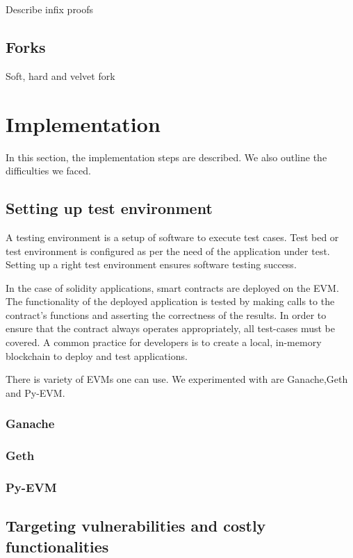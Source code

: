 \documentclass{article}
\begin{document}
  Describe infix proofs

  \subsection{Forks}

  Soft, hard and velvet fork

  \section{Implementation}

  In this section, the implementation steps are described. We also
  outline the difficulties we faced.

  \subsection{Setting up test environment}

  A testing environment is a setup of software to execute test cases.
  Test bed or test environment is configured as per the need of the
  application under test. Setting up a right test environment ensures
  software testing success.

  In the case of solidity applications, smart contracts are deployed on
  the EVM. The functionality of the deployed application is tested by
  making calls to the contract's functions and asserting the correctness
  of the results. In order to ensure that the contract always operates
  appropriately, all test-cases must be covered. A common practice for
  developers is to create a local, in-memory blockchain to deploy and
  test applications.

  There is variety of EVMs one can use. We experimented with are
  Ganache,Geth and Py-EVM.

  \subsubsection{Ganache}

  \subsubsection{Geth}

  \subsubsection{Py-EVM}

  \subsection{Targeting vulnerabilities and costly functionalities}
\end{document}
